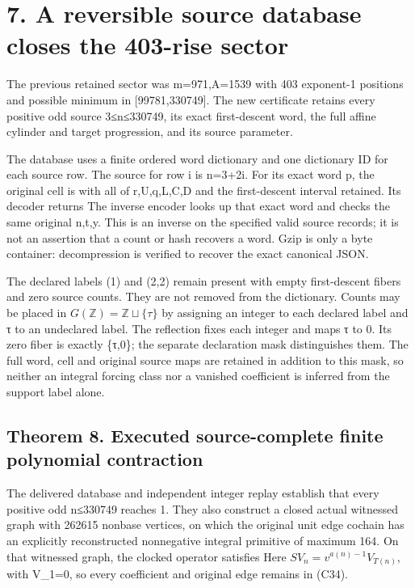 \section{7. A reversible source database closes the 403-rise sector}

The previous retained sector was m=971,A=1539 with 403 exponent-1
positions and possible minimum in {[}99781,330749{]}. The new
certificate retains every positive odd source 3≤n≤330749, its exact
first-descent word, the full affine cylinder and target progression, and
its source parameter.

The database uses a finite ordered word dictionary and one dictionary ID
for each source row. The source for row i is n=3+2i. For its exact word
p, the original cell is  with
all of r,U,q,L,C,D and the first-descent interval retained. Its decoder
returns  The inverse encoder looks up that
exact word and checks the same original n,t,y. This is an inverse on the
specified valid source records; it is not an assertion that a count or
hash recovers a word. Gzip is only a byte container: decompression is
verified to recover the exact canonical JSON.

The declared labels (1) and (2,2) remain present with empty
first-descent fibers and zero source counts. They are not removed from
the dictionary. Counts may be placed in
\(G(\mathbb Z)=\mathbb Z\sqcup\{\tau\}\) by assigning an integer to each
declared label and τ to an undeclared label. The reflection fixes each
integer and maps τ to 0. Its zero fiber is exactly \{τ,0\}; the separate
declaration mask distinguishes them. The full word, cell and original
source maps are retained in addition to this mask, so neither an
integral forcing class nor a vanished coefficient is inferred from the
support label alone.

\subsection{Theorem 8. Executed source-complete finite polynomial
contraction}

The delivered database and independent integer replay establish that
every positive odd n≤330749 reaches 1. They also construct a closed
actual witnessed graph with 262615 nonbase vertices, on which the
original unit edge cochain has an explicitly reconstructed nonnegative
integral primitive of maximum 164. On that witnessed graph, the clocked
operator satisfies  Here
\(S V_n=v^{a(n)-1}V_{T(n)}\), with V\_1=0, so every coefficient and
original edge remains in (C34).

